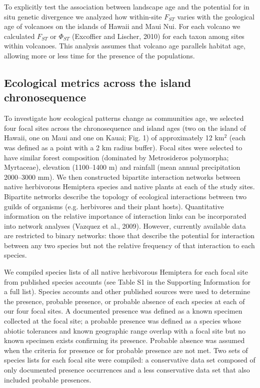 To explicitly test the association between landscape age and the
potential for in situ genetic divergence we analyzed how within-site
$F_{ST}$ varies with the geological age of volcanoes on the islands of
Hawaii and Maui Nui. For each volcano we calculated $F_{ST}$ or
$\Phi_{ST}$ (Excoffier and Lischer, 2010) for each taxon among sites
within volcanoes. This analysis assumes that volcano age parallels
habitat age, allowing more or less time for the presence of the
populations.


\subsection{Ecological metrics across the island chronosequence}

To investigate how ecological patterns change as communities age, we
selected four focal sites across the chronosequence and island ages
(two on the island of Hawaii, one on Maui and one on Kauai; Fig. 1) of
approximately 12 km$^2$ (each was defined as a point with a 2 km radius
buffer). Focal sites were selected to have similar forest composition
(dominated by Metrosideros polymorpha; Myrtaceae), elevation
(1100–1400 m) and rainfall (mean annual precipitation 2000–3000
mm). We then constructed bipartite interaction networks between native
herbivorous Hemiptera species and native plants at each of the study
sites. Bipartite networks describe the topology of ecological
interactions between two guilds of organisms (e.g. herbivores and
their plant hosts). Quantitative information on the relative
importance of interaction links can be incorporated into network
analyses (Vazquez et al., 2009). However, currently available data are
restricted to binary networks: those that describe the potential for
interaction between any two species but not the relative frequency of
that interaction to each species.

We compiled species lists of all native herbivorous Hemiptera for each
focal site from published species accounts (see Table S1 in the
Supporting Information for a full list). Species accounts and other
published sources were used to determine the presence, probable
presence, or probable absence of each species at each of our four
focal sites. A documented presence was defined as a known specimen
collected at the focal site; a probable presence was defined as a
species whose abiotic tolerances and known geographic range overlap
with a focal site but no known specimen exists confirming its
presence. Probable absence was assumed when the criteria for presence
or for probable presence are not met. Two sets of species lists for
each focal site were compiled: a conservative data set composed of
only documented presence occurrences and a less conservative data set
that also included probable presences.

